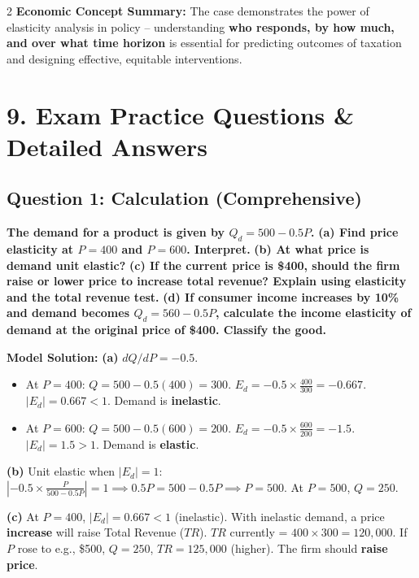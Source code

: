 \documentclass[10pt,a4paper]{article}
\begin{document}
\begin{multicols}{2}
\textbf{Economic Concept Summary:} The case demonstrates the power of elasticity analysis in policy -- understanding \textbf{who responds, by how much, and over what time horizon} is essential for predicting outcomes of taxation and designing effective, equitable interventions.

\section*{9. Exam Practice Questions \& Detailed Answers}

\subsection*{Question 1: Calculation (Comprehensive)}
\textbf{The demand for a product is given by $Q_d = 500 - 0.5P$.}
\textbf{(a) Find price elasticity at $P = 400$ and $P = 600$. Interpret.}
\textbf{(b) At what price is demand unit elastic?}
\textbf{(c) If the current price is \$400, should the firm raise or lower price to increase total revenue? Explain using elasticity and the total revenue test.}
\textbf{(d) If consumer income increases by 10\% and demand becomes $Q_d = 560 - 0.5P$, calculate the income elasticity of demand at the original price of \$400. Classify the good.}

\vspace{0.1cm}
\textbf{Model Solution:}
\vspace{0.05cm}
\textbf{(a)} $dQ/dP = -0.5$.
\begin{itemize}[nosep]
    \item At $P=400$: $Q = 500 - 0.5(400) = 300$. $E_d = -0.5 \times \frac{400}{300} = -0.667$. $|E_d| = 0.667 < 1$. Demand is \textbf{inelastic}.
    \item At $P=600$: $Q = 500 - 0.5(600) = 200$. $E_d = -0.5 \times \frac{600}{200} = -1.5$. $|E_d| = 1.5 > 1$. Demand is \textbf{elastic}.
\end{itemize}
\textbf{(b)} Unit elastic when $|E_d| = 1$:
$| -0.5 \times \frac{P}{500 - 0.5P} | = 1 \implies 0.5P = 500 - 0.5P \implies P = 500$. At $P=500$, $Q=250$.

\textbf{(c)} At $P=400$, $|E_d| = 0.667 < 1$ (inelastic). With inelastic demand, a price \textbf{increase} will raise Total Revenue ($TR$). $TR$ currently = $400 \times 300 = 120,000$. If $P$ rose to e.g., \$500, $Q=250$, $TR = 125,000$ (higher). The firm should \textbf{raise price}.


\end{multicols}
\end{document}
